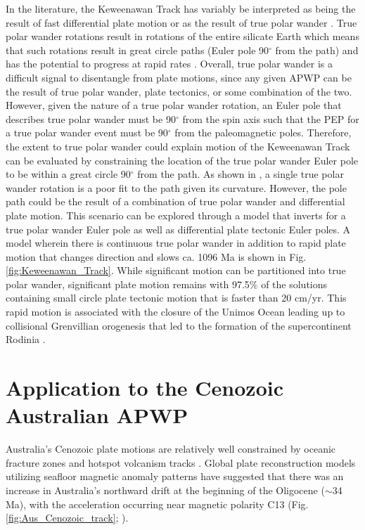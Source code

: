 \documentclass[11pt,letterpaper]{article}
\begin{document}
In the literature, the Keweenawan Track has variably be interpreted as being the result of fast differential plate motion \citep[e.g.][]{Davis1997a} or as the result of true polar wander \citep[e.g.][]{Evans2003a}. True polar wander rotations result in rotations of the entire silicate Earth which means that such rotations result in great circle paths (Euler pole 90$^\circ$ from the path) and has the potential to progress at rapid rates \citep{Rose2017b}. Overall, true polar wander is a difficult signal to disentangle from plate motions, since any given APWP can be the result of true polar wander, plate tectonics, or some combination of the two. However, given the nature of a true polar wander rotation, an Euler pole that describes true polar wander must be 90$^\circ$ from the spin axis such that the PEP for a true polar wander event must be 90$^\circ$ from the paleomagnetic poles. Therefore, the extent to true polar wander could explain motion of the Keweenawan Track can be evaluated by constraining the location of the true polar wander Euler pole to be within a great circle 90$^\circ$ from the path. As shown in \cite{Swanson-Hysell2019a}, a single true polar wander rotation is a poor fit to the path given its curvature. However, the pole path could be the result of a combination of true polar wander and differential plate motion. This scenario can be explored through a model that inverts for a true polar wander Euler pole as well as differential plate tectonic Euler poles. A model wherein there is continuous true polar wander in addition to rapid plate motion that changes direction and slows ca. 1096 Ma is shown in Fig. \ref{fig:Keweenawan_Track}. While significant motion can be partitioned into true polar wander, significant plate motion remains with 97.5$\%$ of the solutions containing small circle plate tectonic motion that is faster than 20 cm/yr. This rapid motion is associated with the closure of the Unimos Ocean leading up to collisional Grenvillian orogenesis that led to the formation of the supercontinent Rodinia \citep{Swanson-Hysell2021d}.

\section*{Application to the Cenozoic Australian APWP}
\label{sec:australia}

Australia's Cenozoic plate motions are relatively well constrained by oceanic fracture zones and hotspot volcanism tracks \citep{Muller2016a}. Global plate reconstruction models utilizing seafloor magnetic anomaly patterns have suggested that there was an increase in Australia's northward drift at the beginning of the Oligocene ($\sim$34 Ma), with the acceleration occurring near magnetic polarity C13 (Fig. \ref{fig:Aus_Cenozoic_track}; \cite{Tikku1999a}). 
\end{document}
